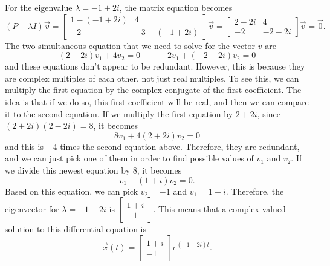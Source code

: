 \begin{exampleSol}
For the eigenvalue $\lambda = -1 + 2i$, the matrix equation becomes
\begin{equation*}
(P - \lambda I)\vec{v} = \begin{bmatrix} 1 - (-1 + 2i) & 4 \\ -2 & -3 - (-1 + 2i) \end{bmatrix} \vec{v} = \begin{bmatrix} 2 - 2i & 4 \\ -2 & -2 -2i \end{bmatrix}\vec{v} = \vec{0}. 
\end{equation*}
The two simultaneous equation that we need to solve for the vector $v$ are 
\begin{equation*}
(2-2i)v_1 + 4v_2 = 0 \qquad -2v_1 + (-2-2i)v_2 = 0
\end{equation*}
and these equations don't appear to be redundant. However, this is because they are complex multiples of each other, not just real multiples. To see this, we can multiply the first equation by the complex conjugate of the first coefficient. The idea is that if we do so, this first coefficient will be real, and then we can compare it to the second equation. If we multiply the first equation by $2 + 2i$, since $(2+2i)(2-2i) = 8$, it becomes
\begin{equation*}
8v_1 + 4(2+2i)v_2 = 0
\end{equation*}
and this is $-4$ times the second equation above. Therefore, they are redundant, and we can just pick one of them in order to find possible values of $v_1$ and $v_2$. If we divide this newest equation by $8$, it becomes
\begin{equation*}
v_1 + (1+i)v_2 = 0.
\end{equation*}
Based on this equation, we can pick $v_2 = -1$ and $v_1 = 1+i$. Therefore, the eigenvector for $\lambda = -1 + 2i$ is $\left[ \begin{smallmatrix} 1+i \\ -1 \end{smallmatrix} \right]$. This means that a complex-valued solution to this differential equation is
\begin{equation*}
\vec{x}(t) = \begin{bmatrix} 1+i \\ -1 \end{bmatrix} e^{(-1 + 2i)t}.
\end{equation*}


\end{exampleSol}
